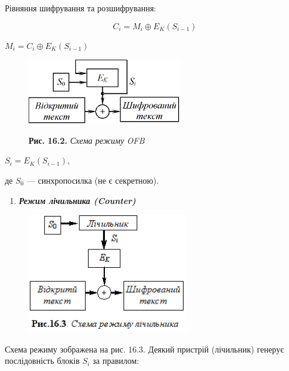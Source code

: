 \bigskip

Рівняння шифрування та розшифрування:

\begin{equation*}
{C_{i}=M_{i}{\oplus}E_{K}(S_{i-1})}
\end{equation*}
{\centering  $M_{i}=C_{i}{\oplus}E_K(S_{i-1})$\par}

\begin{figure}
\centering
\begin{minipage}{2.7689in}
 \includegraphics[width=2.6425in,height=1.1146in]{crypt-img/crypt-img338.png} 

{\centering
\textbf{Рис. }\textbf{16}\textbf{.2.} \textit{Схема режим}\textit{у}\textit{
}\textit{OFB}
\par}
\end{minipage}
\end{figure}
{\centering
 $S_{i}=E_K(S_{i-1})$,
\par}

де  $S_0$ --- синхропосилка (не є секретною).


\bigskip


\bigskip

\liststyleWWviiiNumxxi
\setcounter{saveenum}{\value{enumi}}
\begin{enumerate}
\setcounter{enumi}{\value{saveenum}}
\item {\centering\bfseries\itshape
Режим лічильника (Counter)
\par}
\end{enumerate}
{\centering \par}

\begin{figure}
\centering
\includegraphics[width=2.7709in,height=2.052in]{crypt-img/crypt-img339.png}
\end{figure}
Схема режиму зображена на рис. 16.3. Деякий пристрій (лічильник) генерує
послідовність блоків  $S_i$ за правилом: 

